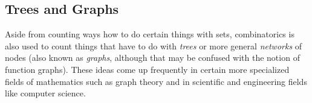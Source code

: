 



\subsection{Trees and Graphs}
Aside from counting ways how to do certain things with sets, combinatorics is also used to count things that have to do with \emph{trees} or more general \emph{networks} of nodes (also known as \emph{graphs}, although that may be confused with the notion of function graphs). These ideas come up frequently in certain more specialized fields of mathematics such as graph theory and in scientific and engineering fields like computer science.


\label{Sec:CatalanNumbers}
